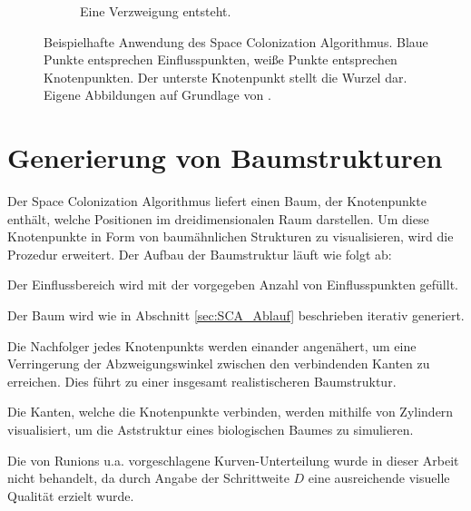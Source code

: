 \begin{figure} [hbtp]
\begin{subfigure}[t]{.31\textwidth}
		\caption{Eine Verzweigung entsteht.}
		\label{subfig:SCA_Basic8}
	\end{subfigure}
	\caption{Beispielhafte Anwendung des Space Colonization Algorithmus. Blaue Punkte entsprechen Einflusspunkten, weiße Punkte entsprechen Knotenpunkten. Der unterste Knotenpunkt stellt die Wurzel dar. Eigene Abbildungen auf Grundlage von \cite[Abb. 2]{SpaceColonizationAlgorithm:07}.}\label{fig:SCA_Basic}
	
\end{figure}


\section{Generierung von Baumstrukturen}
\label{sec:GenerierungBaumstrukturen}
Der Space Colonization Algorithmus liefert einen Baum, der Knotenpunkte enthält, welche Positionen im dreidimensionalen Raum darstellen. Um diese Knotenpunkte in Form von baumähnlichen Strukturen zu visualisieren, wird die Prozedur erweitert. Der Aufbau der Baumstruktur läuft wie folgt ab:

\begin{description}[labelindent]
	\item[\boldmath$1.$] Der Einflussbereich wird mit der vorgegeben Anzahl von Einflusspunkten gefüllt. \cite[Abschn. 2]{SpaceColonizationAlgorithm:07} \\

	\item[\boldmath$2.$] Der Baum wird wie in Abschnitt \ref{sec:SCA_Ablauf} beschrieben iterativ generiert. \cite[Abschn. 2]{SpaceColonizationAlgorithm:07} \\

	\item[\boldmath$3.$] Die Nachfolger jedes Knotenpunkts werden einander angenähert, um eine Verringerung der Abzweigungswinkel zwischen den verbindenden Kanten zu erreichen. Dies führt zu einer insgesamt realistischeren Baumstruktur. \cite[Abschn. 2]{SpaceColonizationAlgorithm:07} \\
	
	\item[\boldmath$4.$] Die Kanten, welche die Knotenpunkte verbinden, werden mithilfe von Zylindern visualisiert, um die Aststruktur eines biologischen Baumes zu simulieren. \cite[Abschn. 2]{SpaceColonizationAlgorithm:07} 
	
\end{description}

Die von Runions u.a. \cite{SpaceColonizationAlgorithm:07} vorgeschlagene Kurven-Unterteilung \cite[Abschn. 2]{SpaceColonizationAlgorithm:07} wurde in dieser Arbeit nicht behandelt, da durch Angabe der Schrittweite $D$ eine ausreichende visuelle Qualität erzielt wurde.

